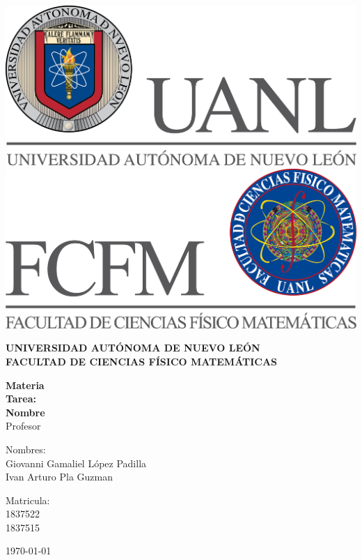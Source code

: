 \begin{titlepage}
\begin{center}
\includegraphics[scale=0.40]{Images/uanl.png}
\hspace{2.5cm}
\includegraphics[scale=0.40]{Images/fcfm.png}
\end{center}
\vspace{1.5cm}
\begin{center}
\large{\textbf{
UNIVERSIDAD AUTÓNOMA DE NUEVO LEÓN\\
FACULTAD DE CIENCIAS
FÍSICO MATEMÁTICAS}}\\
\vspace*{2.5cm}
\begin{large}
\textbf{Materia}\\
\textbf{Tarea:\\Nombre  \vspace{0.5cm}\\}
Profesor\\
\end{large}
\vspace{3.5cm}
\begin{minipage}{0.6\linewidth}
\vspace{0.5cm}
\changefontsizes{14pt}
Nombres:\\
Giovanni Gamaliel López Padilla\\
Ivan Arturo Pla Guzman\\
\end{minipage}
\begin{minipage}{0.2\linewidth}
\changefontsizes{14pt}
Matricula:\\
1837522\\
1837515
\end{minipage}
\end{center}
\vspace{4cm}
\begin{flushright}
\today
\end{flushright}
\pagebreak
\end{titlepage}